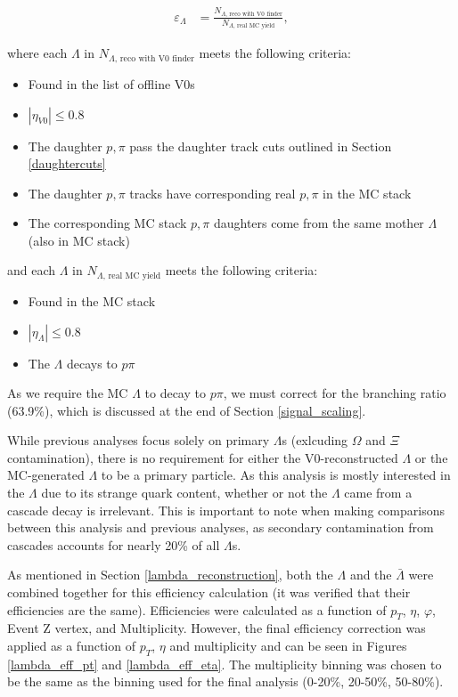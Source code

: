 \documentclass[ALICE,manyauthors]{ALICE_analysis_notes}
\begin{document}
\begin{align*}
	\varepsilon_{\Lambda} &=  \frac{N_{\Lambda\text{, reco with V0 finder}}}{N_{\Lambda\text{, real MC yield}}},
\end{align*}

where each $\Lambda$ in $N_{\Lambda\text{, reco with V0 finder}}$ meets the following criteria:

\begin{itemize}
	\item Found in the list of offline V0s
	\item $|\eta_{V0}| \leq 0.8$
	\item The daughter $p, \pi$ pass the daughter track cuts outlined in Section \ref{daughtercuts}
	\item The daughter $p, \pi$ tracks have corresponding real $p, \pi$ in the MC stack
	\item The corresponding MC stack $p, \pi$ daughters come from the same mother $\Lambda$ (also in MC stack)
\end{itemize}

and each $\Lambda$ in $N_{\Lambda\text{, real MC yield}}$ meets the following criteria:

\begin{itemize}
	\item Found in the MC stack
	\item $|\eta_{\Lambda}| \leq 0.8$
	\item The $\Lambda$ decays to $p\pi$
\end{itemize}
As we require the MC $\Lambda$ to decay to $p\pi$, we must correct for the branching ratio (63.9\%), which is discussed at the end of Section \ref{signal_scaling}.

While previous analyses focus solely on primary $\Lambda$s (exlcuding $\Omega$ and $\Xi$ contamination), there is no requirement for either the V0-reconstructed $\Lambda$ or the MC-generated $\Lambda$ to be a primary particle. As this analysis is mostly interested in the $\Lambda$ due to its strange quark content, whether or not the $\Lambda$ came from a cascade decay is irrelevant. This is important to note when making comparisons between this analysis and previous analyses, as secondary contamination from cascades accounts for nearly 20\% of all $\Lambda$s.

As mentioned in Section \ref{lambda_reconstruction}, both the $\Lambda$ and the $\bar{\Lambda}$ were combined together for this efficiency calculation (it was verified that their efficiencies are the same). Efficiencies were calculated as a function of $p_T$, $\eta$, $\varphi$, Event Z vertex, and Multiplicity. However, the final efficiency correction was applied as a function of $p_T$, $\eta$ and multiplicity and can be seen in Figures \ref{lambda_eff_pt} and \ref{lambda_eff_eta}. The multiplicity binning was chosen to be the same as the binning used for the final analysis (0-20\%, 20-50\%, 50-80\%).
\end{document}
